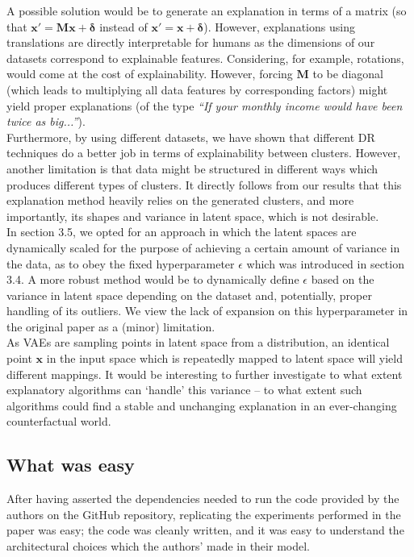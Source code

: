 A possible solution would be to generate an explanation in terms of a matrix (so that $\boldsymbol{x'} = \boldsymbol{Mx} + \boldsymbol{\delta}$ instead of $\boldsymbol{x'} = \boldsymbol{x} + \boldsymbol{\delta}$). However, explanations using translations are directly interpretable for humans as the dimensions of our datasets correspond to explainable features. Considering, for example, rotations, would come at the cost of explainability. However, forcing $\boldsymbol{M}$ to be diagonal (which leads to multiplying all data features by corresponding factors) might yield proper explanations (of the type \textit{``If your monthly income would have been twice as big...''}).\\

Furthermore, by using different datasets, we have shown that different DR techniques do a better job in terms of explainability between clusters. However, another limitation is that data might be structured in different ways which produces different types of clusters. It directly follows from our results that this explanation method heavily relies on the generated clusters, and more importantly, its shapes and variance in latent space, which is not desirable.\\

In section 3.5, we opted for an approach in which the latent spaces are dynamically scaled for the purpose of achieving a certain amount of variance in the data, as to obey the fixed hyperparameter $\epsilon$ which was introduced in section 3.4. A more robust method would be to dynamically define $\epsilon$ based on the variance in latent space depending on the dataset and, potentially, proper handling of its outliers. We view the lack of expansion on this hyperparameter in the original paper as a (minor) limitation.\\

As VAEs are sampling points in latent space from a distribution, an identical point $\boldsymbol{x}$ in the input space which is repeatedly mapped to latent space will yield different mappings. It would be interesting to further investigate to what extent explanatory algorithms can `handle' this variance -- to what extent such algorithms could find a stable and unchanging explanation in an ever-changing counterfactual world.


\subsection{What was easy}
After having asserted the dependencies needed to run the code provided by the authors on the GitHub repository, replicating the experiments performed in the paper was easy; the code was cleanly written, and it was easy to understand the architectural choices which the authors' made in their model.


